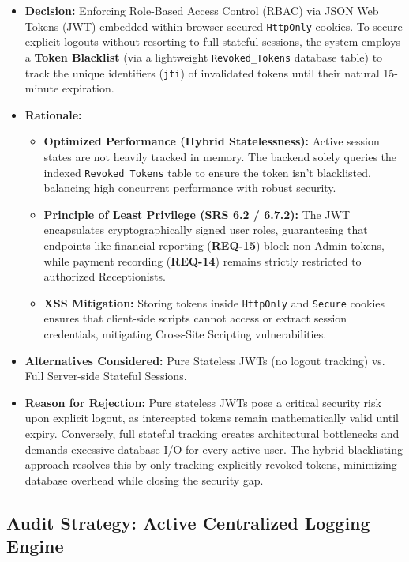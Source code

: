 \begin{itemize}
	\item \textbf{Decision:} Enforcing Role-Based Access Control (RBAC) via JSON Web Tokens (JWT) embedded within browser-secured \texttt{HttpOnly} cookies. To secure explicit logouts without resorting to full stateful sessions, the system employs a \textbf{Token Blacklist} (via a lightweight \texttt{Revoked\_Tokens} database table) to track the unique identifiers (\texttt{jti}) of invalidated tokens until their natural 15-minute expiration.
	\item \textbf{Rationale:} 
	\begin{itemize}
		\item \textbf{Optimized Performance (Hybrid Statelessness):} Active session states are not heavily tracked in memory. The backend solely queries the indexed \texttt{Revoked\_Tokens} table to ensure the token isn't blacklisted, balancing high concurrent performance with robust security.
		\item \textbf{Principle of Least Privilege (SRS 6.2 / 6.7.2):} The JWT encapsulates cryptographically signed user roles, guaranteeing that endpoints like financial reporting (\textbf{REQ-15}) block non-Admin tokens, while payment recording (\textbf{REQ-14}) remains strictly restricted to authorized Receptionists.
		\item \textbf{XSS Mitigation:} Storing tokens inside \texttt{HttpOnly} and \texttt{Secure} cookies ensures that client-side scripts cannot access or extract session credentials, mitigating Cross-Site Scripting vulnerabilities.
	\end{itemize}
	\item \textbf{Alternatives Considered:} Pure Stateless JWTs (no logout tracking) vs. Full Server-side Stateful Sessions.
	\item \textbf{Reason for Rejection:} Pure stateless JWTs pose a critical security risk upon explicit logout, as intercepted tokens remain mathematically valid until expiry. Conversely, full stateful tracking creates architectural bottlenecks and demands excessive database I/O for every active user. The hybrid blacklisting approach resolves this by only tracking explicitly revoked tokens, minimizing database overhead while closing the security gap.
\end{itemize}
\subsection{Audit Strategy: Active Centralized Logging Engine}
\label{subsec:rationale_audit}

